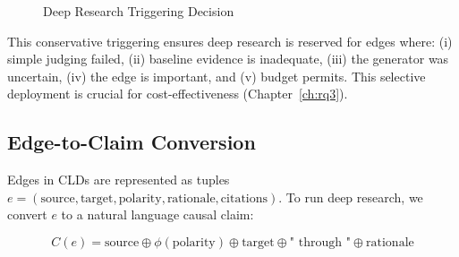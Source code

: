 \begin{figure}[h]
\centering
{}
\caption{Deep Research Triggering Decision}
\label{alg:trigger}
\end{figure}

This conservative triggering ensures deep research is reserved for edges where: (i) simple judging failed, (ii) baseline evidence is inadequate, (iii) the generator was uncertain, (iv) the edge is important, and (v) budget permits. This selective deployment is crucial for cost-effectiveness (Chapter~\ref{ch:rq3}).

\subsection{Edge-to-Claim Conversion}

Edges in CLDs are represented as tuples $e = (\text{source}, \text{target}, \text{polarity}, \text{rationale}, \text{citations})$. To run deep research, we convert $e$ to a natural language causal claim:

\begin{equation}
C(e) = \text{source} \oplus \phi(\text{polarity}) \oplus \text{target} \oplus \text{" through "} \oplus \text{rationale}
\label{eq:edge_to_claim}
\end{equation}

